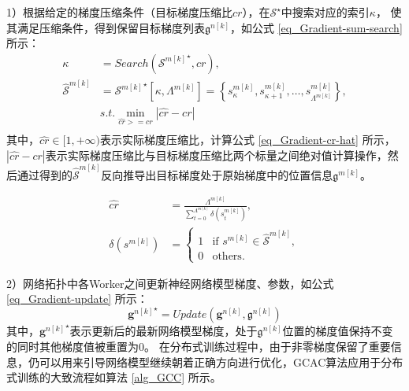 \documentclass{xdupgthesis}
\begin{document}
1）根据给定的梯度压缩条件（目标梯度压缩比$cr$），在$\mathcal{S}^\star$中搜索对应的索引$\kappa$，
使其满足压缩条件，得到保留目标梯度列表$\mathfrak{g}^{n[k]}$，如公式 \eqref{eq_Gradient-sum-search} 所示：
\begin{equation}
    \begin{aligned}
        \kappa &= Search \left({\mathcal{S}^{m[k]}}^\star, cr\right), \\
       \hat{\mathcal{S}}^{m[k]} &= {\mathcal{S}^{m[k]}}^{\star}\left[\kappa, \Lambda^{m[k]} \right]
            = \left\{
                s_{\kappa}^{m[k]}, s_{\kappa+1}^{m[k]}, \dots, s_{\Lambda^{m[k]}}^{m[k]}
            \right\} ,\\
        & s.t. \min_{\hat{cr} >= cr} \left\lvert \hat{cr} - cr \right\rvert \\
    \end{aligned}
    \label{eq_Gradient-sum-search}
\end{equation}
其中，$\hat{cr} \in [1, +\infty)$表示实际梯度压缩比，计算公式 \eqref{eq_Gradient-cr-hat} 所示，
$\left\lvert \hat{cr} - cr \right\rvert$表示实际梯度压缩比与目标梯度压缩比两个标量之间绝对值计算操作，然后通过得到的$\hat{\mathcal{S}}^{m[k]}$反向推导出目标梯度处于原始梯度中的位置信息$\mathfrak{g}^{m[k]}$。

\begin{equation}
    \begin{aligned}
        \hat{cr} &= \frac{\Lambda^{m[k]}}
                    {\sum_{t = 0}^{\Lambda^{m[k]}} \delta\left(
                                        s_{t}^{m[k]}\right)}, \\
        \delta\left(s^{m[k]}\right) &=
        \begin{cases}
            1 & \text{if } s^{m[k]} \in \hat{\mathcal{S}}^{m[k]},\\
            0 & \text{others}.
        \end{cases}
    \end{aligned}
    \label{eq_Gradient-cr-hat}
\end{equation}

2）网络拓扑中各Worker之间更新神经网络模型梯度、参数，如公式 \eqref{eq_Gradient-update} 所示：
\begin{equation}
    {\mathbf{g}^{n[k]}}^{\star} = 
        Update\left( \mathbf{g}^{n[k]}, \mathfrak{g}^{n[k]} \right)
    \label{eq_Gradient-update}
\end{equation}
其中，${\mathbf{g}^{n[k]}}^{\star}$表示更新后的最新网络模型梯度，处于$\mathfrak{g}^{n[k]}$位置的梯度值保持不变的同时其他梯度值被重置为0。
在分布式训练过程中，由于非零梯度保留了重要信息，仍可以用来引导网络模型继续朝着正确方向进行优化，GCAC算法应用于分布式训练的大致流程如算法 \ref{alg_GCC} 所示。
\end{document}
